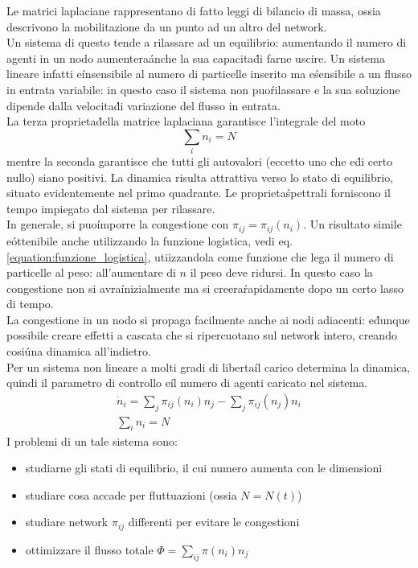 \documentclass[12pt, a4paper]{book}
\theoremstyle{theorem}
\begin{document}
				Le matrici laplaciane rappresentano di fatto leggi di bilancio di massa, ossia descrivono la mobilitazione da un punto ad un altro del network.\\
				Un sistema di questo tende a rilassare ad un equilibrio: aumentando il numero di agenti in un nodo aumentera\' anche la sua capacita\' di farne uscire.
				Un sistema lineare infatti e\' insensibile al numero di particelle inserito ma e\' sensibile a un flusso in entrata variabile: in questo caso il sistema non puo\' rilassare e la sua soluzione dipende dalla velocita\' di variazione del flusso in entrata.\\
				La terza proprieta\' della matrice laplaciana garantisce l'integrale del moto
				\begin{equation*}
					\sum_in_i=N
				\end{equation*}
				mentre la seconda garantisce che tutti gli autovalori (eccetto uno che e\' di certo nullo) siano positivi.
				La dinamica risulta attrattiva verso lo stato di equilibrio, situato evidentemente nel primo quadrante.
				Le proprieta\' spettrali forniscono il tempo impiegato dal sistema per rilassare.\\
				In generale, si puo\' imporre la congestione con $\pi_{ij}=\pi_{ij}(n_i)$.
				Un risultato simile e\' ottenibile anche utilizzando la funzione logistica, vedi eq. \ref{equation:funzione_logistica}, utiizzandola come funzione che lega il numero di particelle al peso: all'aumentare di $n$ il peso deve ridursi.
				In questo caso la congestione non si avra\' inizialmente ma si creera\' rapidamente dopo un certo lasso di tempo.\\
				La congestione in un nodo si propaga facilmente anche ai nodi adiacenti: e\' dunque possibile creare effetti a cascata che si ripercuotano sul network intero, creando cosi\' una dinamica all'indietro.\\
				Per un sistema non lineare a molti gradi di liberta\' il carico determina la dinamica, quindi il parametro di controllo e\' il numero di agenti caricato nel sistema.
				\begin{equation*}
					\begin{split}
						\dot{n}_i=\sum_j\pi_{ij}(n_i)n_j-\sum_j\pi_{ij}(n_j)n_i\\
						\sum_in_i=N
					\end{split}
				\end{equation*}
				I problemi di un tale sistema sono:
				\begin{itemize}
					\item studiarne gli stati di equilibrio, il cui numero aumenta con le dimensioni
					\item studiare cosa accade per fluttuazioni (ossia $N=N(t)$)
					\item studiare network $\pi_{ij}$ differenti per evitare le congestioni
					\item ottimizzare il flusso totale $\Phi=\sum_{ij}\pi(n_{i})n_j$
				\end{itemize}
\end{document}
